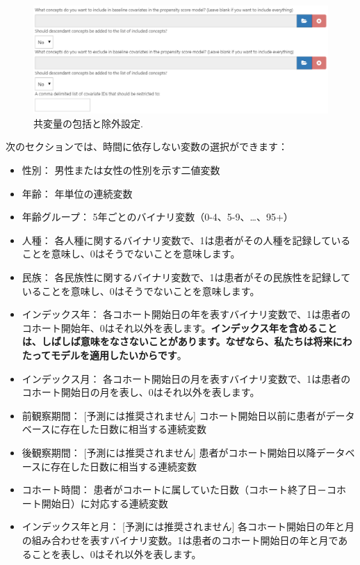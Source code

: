 \documentclass[
  11pt]{book}
\theoremstyle{definition}
\theoremstyle{definition}
\theoremstyle{definition}
\theoremstyle{definition}
\theoremstyle{remark}
\begin{document}
\begin{figure}

{\centering \includegraphics[width=1\linewidth]{images/PatientLevelPrediction/covariateSettings1} 

}

\caption{共変量の包括と除外設定.}\label{fig:covariateSettings1}
\end{figure}

次のセクションでは、時間に依存しない変数の選択ができます：

\begin{itemize}
\item
  性別： 男性または女性の性別を示す二値変数
\item
  年齢： 年単位の連続変数
\item
  年齢グループ： 5年ごとのバイナリ変数（0-4、5-9、\ldots、95+）
\item
  人種： 各人種に関するバイナリ変数で、1は患者がその人種を記録していることを意味し、0はそうでないことを意味します。
\item
  民族： 各民族性に関するバイナリ変数で、1は患者がその民族性を記録していることを意味し、0はそうでないことを意味します。
\item
  インデックス年： 各コホート開始日の年を表すバイナリ変数で、1は患者のコホート開始年、0はそれ以外を表します。\textbf{インデックス年を含めることは、しばしば意味をなさないことがあります。なぜなら、私たちは将来にわたってモデルを適用したいからです}。
\item
  インデックス月： 各コホート開始日の月を表すバイナリ変数で、1は患者のコホート開始日の月を表し、0はそれ以外を表します。
\item
  前観察期間： {[}予測には推奨されません{]} コホート開始日以前に患者がデータベースに存在した日数に相当する連続変数
\item
  後観察期間： {[}予測には推奨されません{]} 患者がコホート開始日以降データベースに存在した日数に相当する連続変数
\item
  コホート時間： 患者がコホートに属していた日数（コホート終了日－コホート開始日）に対応する連続変数
\item
  インデックス年と月： {[}予測には推奨されません{]} 各コホート開始日の年と月の組み合わせを表すバイナリ変数。1は患者のコホート開始日の年と月であることを表し、0はそれ以外を表します。
\end{itemize}
\end{document}
